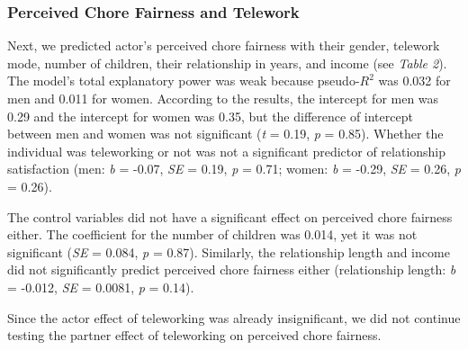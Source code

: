 \documentclass[
  english,
  man]{apa6}
\begin{document}
\hypertarget{perceived-chore-fairness-and-telework}{%
\subsubsection{Perceived Chore Fairness and Telework}\label{perceived-chore-fairness-and-telework}}

Next, we predicted actor's perceived chore fairness with their gender, telework mode, number of children, their relationship in years, and income (see \emph{Table 2}). The model's total explanatory power was weak because pseudo-\(R^2\) was 0.032 for men and 0.011 for women. According to the results, the intercept for men was 0.29 and the intercept for women was 0.35, but the difference of intercept between men and women was not significant (\emph{t} = 0.19, \emph{p} = 0.85). Whether the individual was teleworking or not was not a significant predictor of relationship satisfaction (men: \emph{b} = -0.07, \emph{SE} = 0.19, \emph{p} = 0.71; women: \emph{b} = -0.29, \emph{SE} = 0.26, \emph{p} = 0.26).

The control variables did not have a significant effect on perceived chore fairness either. The coefficient for the number of children was 0.014, yet it was not significant (\emph{SE} = 0.084, \emph{p} = 0.87). Similarly, the relationship length and income did not significantly predict perceived chore fairness either (relationship length: \emph{b} = -0.012, \emph{SE} = 0.0081, \emph{p} = 0.14).

Since the actor effect of teleworking was already insignificant, we did not continue testing the partner effect of teleworking on perceived chore fairness.
\end{document}
